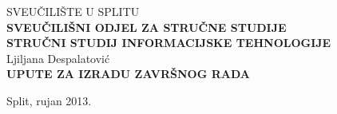 %
%
\begin{titlepage}
\begin{center}

{\large  SVEUČILIŠTE U SPLITU}\\
{\large  \bfseries SVEUČILIŠNI ODJEL ZA STRUČNE STUDIJE}\\
{\large  \bfseries STRUČNI STUDIJ INFORMACIJSKE TEHNOLOGIJE}\\[6cm]

{\large   Ljiljana Despalatović}\\[2cm]
\Large \bfseries UPUTE ZA IZRADU ZAVRŠNOG RADA\\[1cm]

\end{center}
\begin{center}
\vfill
{\large Split, rujan 2013.}
\end{center}
\end{titlepage}
%
%